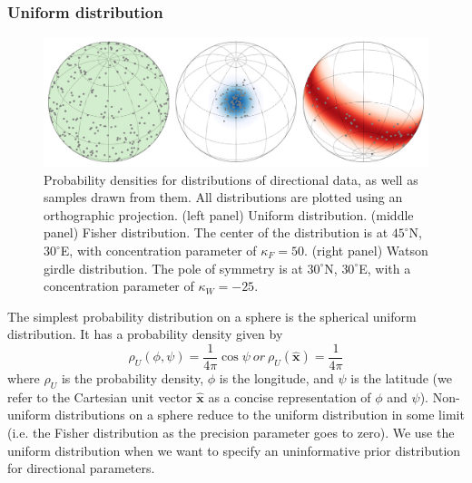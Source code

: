 \documentclass[]{agujournal2019}
\begin{document}
\subsubsection*{Uniform distribution}
\begin{figure}
\centering
\includegraphics[width=\textwidth]{fig_direction_distributions.png}
\caption[Spherical probability distributions.]{Probability densities for distributions of directional data, as well as samples drawn from them. All distributions are plotted using an orthographic projection. (left panel) Uniform distribution. (middle panel) Fisher distribution. The center of the distribution is at $45^\circ$N, $30^\circ$E, with concentration parameter of $\kappa_F=50$. (right panel) Watson girdle distribution. The pole of symmetry is at $30^\circ$N, $30^\circ$E, with a concentration parameter of $\kappa_W=-25$.}
\label{fig:distributions}
\end{figure}

The simplest probability distribution on a sphere is the spherical uniform distribution. It has a probability density given by
\begin{equation}
  \rho_U(\phi, \psi) = \frac{1}{4 \pi} \cos \psi 
\ or \
  \rho_U(\hat{\mathbf{x}}) = \frac{1}{4 \pi}
\end{equation}
where $\rho_U$ is the probability density, $\phi$ is the longitude, and $\psi$ is the latitude (we refer to the Cartesian unit vector $\hat{\mathbf{x}}$ as a concise representation of $\phi$ and $\psi$). Non-uniform distributions on a sphere reduce to the uniform distribution in some limit (i.e. the Fisher distribution as the precision parameter goes to zero). We use the uniform distribution when we want to specify an uninformative prior distribution for directional parameters.
\end{document}
